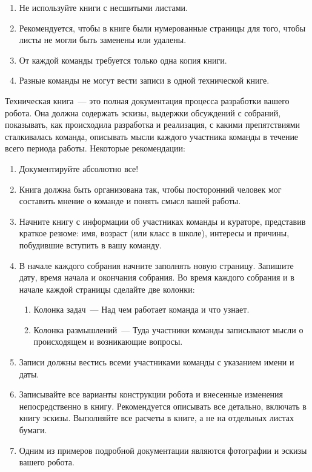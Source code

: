 \begin{enumerate}
	\item Не используйте книги с несшитыми листами. 
	\item Рекомендуется, чтобы в книге были нумерованные страницы для того, чтобы листы не могли быть заменены или удалены.
	\item От каждой команды требуется только одна копия книги.
	\item Разные команды не могут вести записи в одной технической книге.
\end{enumerate}

Техническая книга~--- это полная документация процесса разработки вашего робота. Она должна содержать эскизы, выдержки обсуждений с собраний, показывать, как происходила разработка и реализация, с какими препятствиями сталкивалась команда, описывать мысли каждого участника команды в течение всего периода работы. Некоторые рекомендации:

\begin{enumerate}
	\item Документируйте абсолютно все! 
	\item Книга должна быть организована так, чтобы посторонний человек мог составить мнение о команде и понять смысл вашей работы.
	\item Начните книгу с информации об участниках команды и кураторе, представив краткое резюме: имя, возраст (или класс в школе), интересы и причины, побудившие вступить в вашу команду.
	\item В начале каждого собрания начните заполнять новую страницу. Запишите дату, время начала и окончания собрания. Во время каждого собрания и в начале каждой страницы сделайте две колонки:
	\begin{enumerate}
		\item Колонка задач~--- Над чем работает команда и что узнает.
		\item Колонка размышлений~--- Туда участники команды записывают мысли о происходящем и возникающие вопросы.
	\end{enumerate}
	\item Записи должны вестись всеми участниками команды с указанием имени и даты.
	\item Записывайте все варианты конструкции робота и внесенные изменения непосредственно в книгу. Рекомендуется описывать все детально, включать в книгу эскизы. Выполняйте все расчеты в книге, а не на отдельных листах бумаги.
	\item Одним из примеров подробной документации являются фотографии и эскизы вашего робота.
\end{enumerate}

